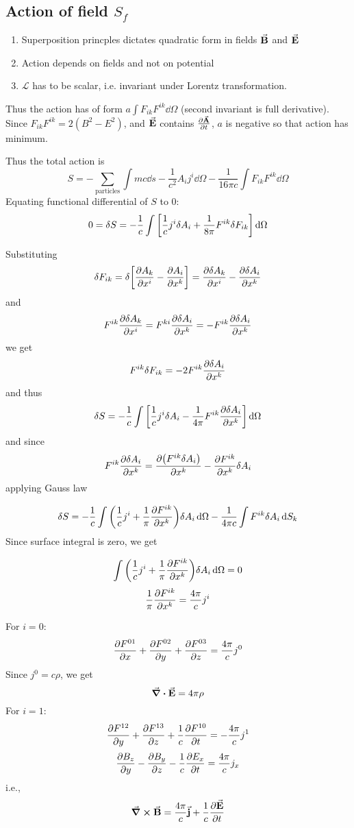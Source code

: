 \subsection{Action of field $S_f$}
\begin{enumerate}
	\item Superposition princples dictates quadratic form in fields $\va{B}$ and $\va{E}$
	\item Action depends on fields and not on potential
	\item $\mathcal{L}$ has to be scalar, i.e. invariant under Lorentz transformation.
\end{enumerate}
Thus the action has of form $a\int F_{ik}F^{ik} \dd{\Omega}$ (second invariant is full derivative). Since $F_{ik}F^{ik}=2(B^2-E^2)$, and $\va{E}$ contains $\pdv{\va{A}}{t}$, $a$ is negative so that action has minimum.

Thus the total action is
$$S = -\sum_{\text{particles}} \int mc \dd{s} - \frac{1}{c^2}A_i j^i \dd{\Omega} - \frac{1}{16\pi c} \int F_{ik}F^{ik} \dd{\Omega}$$
Equating functional differential of $S$ to $0$:
$$0 = \delta S = -\frac{1}{c} \int \qty[\frac{1}{c} j^i \delta A_i + \frac{1}{8\pi} F^{ik}\delta F_{ik}] \dd{\Omega}$$

Substituting
$$\delta F_{ik} = \delta \qty[\pdv{A_k}{x^i} - \pdv{A_i}{x^k}] = \pdv{\delta A_k}{x^i}-\pdv{\delta A_i}{x^k}$$
and
$$F^{ik} \pdv{\delta A_k}{x^i} =F^{ki}  \pdv{\delta A_i}{x^k} = - F^{ik} \pdv{\delta A_i}{x^k} $$
we get
$$F^{ik} \delta F_{ik} = -2 F^{ik}\pdv{\delta A_i}{x^k}  $$
and thus
$$\delta S = -\frac{1}{c} \int \qty[\frac{1}{c} j^i \delta A_i - \frac{1}{4\pi} F^{ik}\pdv{\delta A_i}{x^k} ] \dd{\Omega}$$
and since
$$F^{ik}\pdv{\delta A_i}{x^k} = \pdv{\qty(F^{ik}\delta A_i)}{x^k} - \pdv{F^{ik}}{x^k} \delta A_i$$
applying Gauss law

$$\delta S = -\frac{1}{c} \int \qty(\frac{1}{c} j^i  + \frac{1}{\pi}\pdv{F^{ik}}{x^k})\delta A_i \dd{\Omega}- \frac{1}{4\pi c} \int F^{ik} \delta A_i \dd{S_k}$$
Since surface integral is zero, we get

$$\int \qty(\frac{1}{c} j^i  + \frac{1}{\pi}\pdv{F^{ik}}{x^k})\delta A_i \dd{\Omega} = 0$$
$$ \frac{1}{\pi}\pdv{F^{ik}}{x^k} = \frac{4\pi}{c} j^i  $$


For $i=0$:
$$\pdv{F^{01}}{x}+\pdv{F^{02}}{y}+\pdv{F^{03}}{z} = \frac{4\pi }{c} j^0$$
Since $j^0 = c\rho$, we get
$$\div{\va{E}} = 4\pi \rho$$
For $i=1$:
$$\pdv{F^{12}}{y}+\pdv{F^{13}}{z}+\frac{1}{c}\pdv{F^{10}}{t} = -\frac{4\pi }{c} j^1$$
$$\pdv{B_z}{y} - \pdv{B_y}{z} - \frac{1}{c} \pdv{E_x}{t} = \frac{4\pi}{c} j_x$$
i.e.,
$$\curl{\va{B}} = \frac{4\pi}{c} \va{j} + \frac{1}{c} \pdv{\va{E}}{t}$$
